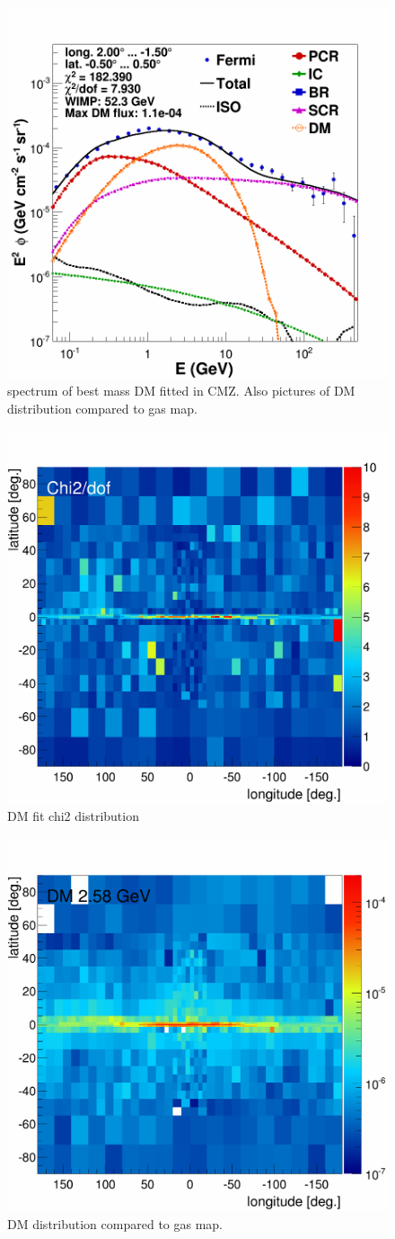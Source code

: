 \begin{figure}[h]
  \centering
  \includegraphics[width=.5\linewidth]{pic/results/DMonly_CMZ.png}
  \caption{spectrum of best mass DM fitted in CMZ. Also pictures of DM distribution compared to gas map.}
  \label{fig:DMonly_CMZ}
\end{figure}

\begin{figure}[h]
  \centering
  \includegraphics[width=.5\linewidth]{pic/results/DMonly_chi2Distribution.png}
  \caption{DM fit chi2 distribution}
  \label{fig:DMonly_chi2Distribution}
\end{figure}

\begin{figure}[h]
  \centering
  \includegraphics[width=.5\linewidth]{pic/results/DMonly_DM_fluxE12_skymap.png}
  \caption{DM distribution compared to gas map.}
  \label{fig:DMonly_skymap_DM}
\end{figure}


